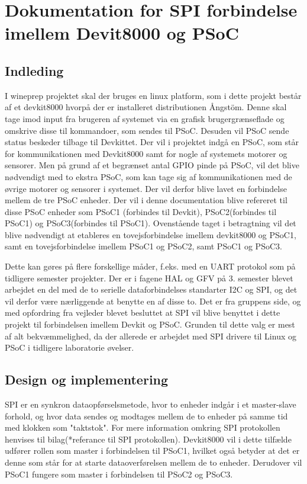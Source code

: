 \chapter*{Dokumentation for SPI forbindelse imellem Devit8000 og PSoC}

\section*{Indleding}
I wineprep projektet skal der bruges en linux platform, som i dette projekt består af et devkit8000 hvorpå der er installeret distributionen Ångstöm. 
Denne skal tage imod input fra brugeren af systemet via en grafisk brugergrænseflade og omskrive disse til kommandoer, som sendes til PSoC. Desuden
vil PSoC sende status beskeder tilbage til Devkittet. 
Der vil i projektet indgå en PSoC, som står for kommunikationen med Devkit8000 samt for nogle af systemets motorer og sensorer.
Men på grund af et begrænset antal GPIO pinde på PSoC, vil det blive nødvendigt med to ekstra PSoC, som kan tage sig af kommunikationen med de 
øvrige motorer og sensorer i systemet. Der vil derfor blive lavet en forbindelse mellem de tre PSoC enheder. Der vil i denne documentation blive 
refereret til disse PSoC enheder som PSoC1 (forbindes til Devkit), PSoC2(forbindes til PSoC1) og PSoC3(forbindes til PSoC1). 
Ovenstående taget i betragtning vil det blive nødvendigt at etableres en tovejsforbindelse imellem devkit8000 og PSoC1, samt en tovejsforbindelse imellem 
PSoC1 og PSoC2, samt PSoC1 og PSoC3. 

Dette kan gøres på flere forskellige måder, f.eks. med en UART protokol som på tidligere semester projekter. Der er i fagene HAL og GFV på 3. semester 
blevet arbejdet en del med de to serielle dataforbindelses standarter I2C og SPI, og det vil derfor være nærliggende at benytte en af disse to. 
Det er fra gruppens side, og med opfordring fra vejleder blevet besluttet at SPI vil blive benyttet i dette projekt til forbindelsen imellem Devkit og 
PSoC. Grunden til dette valg er mest af alt bekvæmmelighed, da der allerede er arbejdet med SPI drivere til Linux og PSoC i tidligere laboratorie øvelser.   

\section*{Design og implementering}
SPI er en synkron dataopførselsmetode, hvor to enheder indgår i et master-slave forhold, og hvor data sendes og modtages mellem de to enheder på
samme tid med klokken som "taktstok". For mere information omkring SPI protokollen henvises til bilag(*referance til SPI protokollen).
Devkit8000 vil i dette tilfælde udfører rollen som master i forbindelsen til PSoC1, hvilket også betyder at det er denne som står for at starte 
dataoverførelsen mellem de to enheder. Derudover vil PSoC1 fungere som master i forbindelsen til PSoC2 og PSoC3. 

